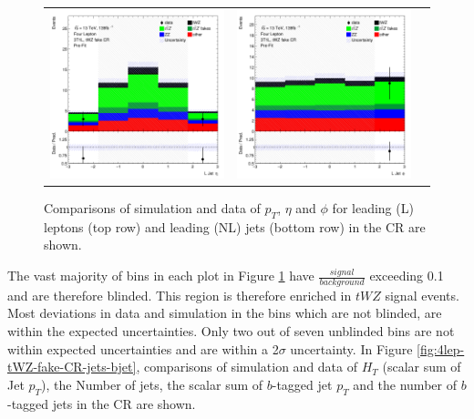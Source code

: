 \begin{figure}[htbp]
\begin{tabular}{ccc}
    \includegraphics[width=.25\textwidth]{figures/PreFitPlots/lep4_tWZ_3T1L_LJet_eta.png} &
    \includegraphics[width=.25\textwidth]{figures/PreFitPlots/lep4_tWZ_3T1L_LJet_phi.png} \\

\end{tabular}
\caption{Comparisons of simulation and data of $p_{T}$, $\eta$ and $\phi$ for leading (L) leptons (top row) and leading (NL) jets (bottom row) in the \tWZfake CR are shown.}
\label{fig:4lep-tWZ-fake-CR-leptonPlots}
\end{figure}The vast majority of bins in each plot in Figure \ref{fig:4lep-tWZ-fake-CR-leptonPlots} have $\frac{signal}{background}$ exceeding 0.1 and are therefore blinded. This region is therefore enriched in $tWZ$ signal events. Most deviations in data and simulation in the bins which are not blinded, are within the expected uncertainties. Only two out of seven unblinded bins are not within expected uncertainties and are within a 2$\sigma$ uncertainty. In Figure \ref{fig:4lep-tWZ-fake-CR-jets-bjet}, comparisons of simulation and data of $H_{T}$ (scalar sum of Jet $p_{T}$), the Number of jets, the scalar sum of $b$-tagged jet $p_{T}$ and the number of $b$-tagged jets in the \tWZfake CR are shown.

